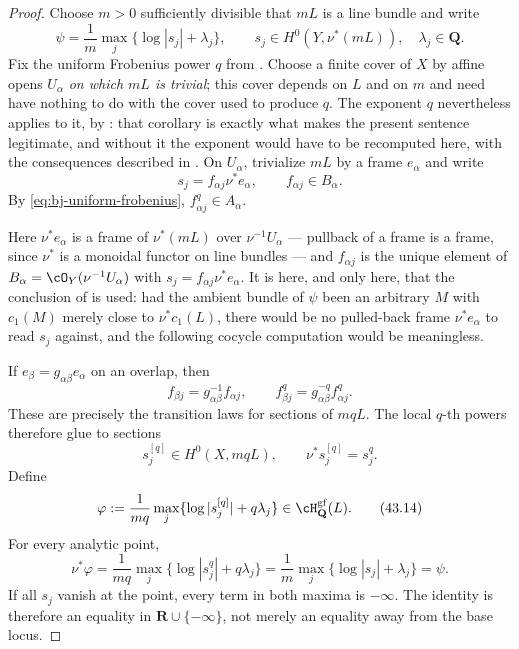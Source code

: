 \begin{proof}
Choose $m>0$ sufficiently divisible that $mL$ is a line bundle and write
\[
 \psi=\frac1m\max_j\{\log|s_j|+\lambda_j\},
 \qquad
 s_j\in H^0(Y,\nu^*(mL)),
 \quad
 \lambda_j\in\mathbf Q.
\tag{43.12}\label{eq:bj-positive-gf}
\]
Fix the uniform Frobenius power $q$ from
.
Choose a finite cover of $X$ by affine opens $U_\alpha$ \emph{on which
$mL$ is trivial}; this cover depends on $L$ and on $m$ and need have
nothing to do with the cover used to produce $q$.  The exponent $q$
nevertheless applies to it, by
: that corollary is exactly what makes
the present sentence legitimate, and without it the exponent would have to
be recomputed here, with the consequences described in
.
On $U_\alpha$, trivialize $mL$ by a frame $e_\alpha$ and write
\[
                         s_j=f_{\alpha j}\nu^*e_\alpha,
             \qquad f_{\alpha j}\in B_\alpha.
\]
By \eqref{eq:bj-uniform-frobenius},
$f_{\alpha j}^q\in A_\alpha$.

Here $\nu^*e_\alpha$ is a frame of $\nu^*(mL)$ over $\nu^{-1}U_\alpha$
--- pullback of a frame is a frame, since $\nu^*$ is a monoidal functor on
line bundles --- and $f_{\alpha j}$ is the unique element of
$B_\alpha=\cO_Y(\nu^{-1}U_\alpha)$ with $s_j=f_{\alpha j}\nu^*e_\alpha$.
It is here, and only here, that the conclusion of
 is used: had the ambient bundle
of $\psi$ been an arbitrary $M$ with $c_1(M)$ merely close to
$\nu^*c_1(L)$, there would be no pulled-back frame $\nu^*e_\alpha$ to
read $s_j$ against, and the following cocycle computation would be
meaningless.

If $e_\beta=g_{\alpha\beta}e_\alpha$ on an overlap, then
\[
 f_{\beta j}=g_{\alpha\beta}^{-1}f_{\alpha j},
 \qquad
 f_{\beta j}^q=g_{\alpha\beta}^{-q}f_{\alpha j}^q.
\]
These are precisely the transition laws for sections of $mqL$.
The local $q$-th powers therefore glue to sections
\[
          s_j^{[q]}\in H^0(X,mqL),
          \qquad
          \nu^*s_j^{[q]}=s_j^q.
\tag{43.13}\label{eq:bj-frobenius-sections}
\]
Define
\[
 \varphi:=\frac1{mq}\max_j
       \{\log|s_j^{[q]}|+q\lambda_j\}
       \in\cH^{\mathrm{gf}}_{\mathbf Q}(L).
\tag{43.14}\label{eq:bj-positive-descended-gf}
\]
For every analytic point,
\[
 \nu^*\varphi
 =\frac1{mq}\max_j
       \{\log|s_j^q|+q\lambda_j\}
 =\frac1m\max_j\{\log|s_j|+\lambda_j\}
 =\psi.
\tag{43.15}\label{eq:bj-positive-gf-identity}
\]
If all $s_j$ vanish at the point, every term in both maxima is
$-\infty$.
The identity is therefore an equality in
$\mathbf R\cup\{-\infty\}$, not merely an equality away from the base
locus.


\end{proof}
